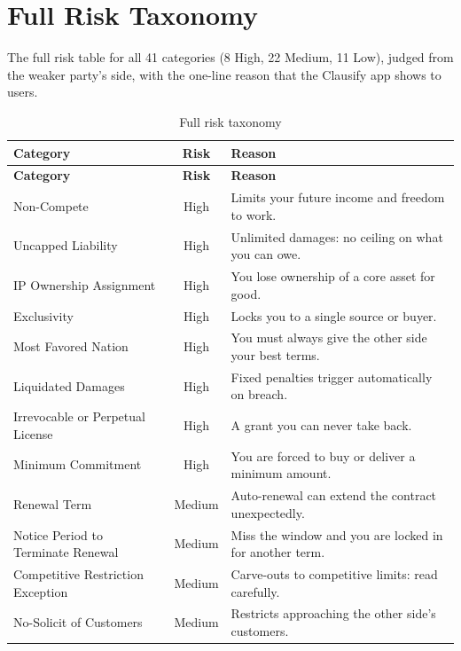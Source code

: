 \chapter{Full Risk Taxonomy}
\label{app:taxonomy}

The full risk table for all 41 categories (8 High, 22 Medium, 11 Low), judged from the weaker party's side, with the one-line reason that the Clausify app shows to users.

\begin{longtable}{>{\raggedright\arraybackslash}p{4.6cm} c >{\raggedright\arraybackslash}p{7.6cm}}
\caption{Full risk taxonomy}\\
\toprule
\textbf{Category} & \textbf{Risk} & \textbf{Reason}\\
\midrule
\endfirsthead
\toprule
\textbf{Category} & \textbf{Risk} & \textbf{Reason}\\
\midrule
\endhead
Non-Compete & \textcolor{riskhigh}{High} & Limits your future income and freedom to work.\\
Uncapped Liability & \textcolor{riskhigh}{High} & Unlimited damages: no ceiling on what you can owe.\\
IP Ownership Assignment & \textcolor{riskhigh}{High} & You lose ownership of a core asset for good.\\
Exclusivity & \textcolor{riskhigh}{High} & Locks you to a single source or buyer.\\
Most Favored Nation & \textcolor{riskhigh}{High} & You must always give the other side your best terms.\\
Liquidated Damages & \textcolor{riskhigh}{High} & Fixed penalties trigger automatically on breach.\\
Irrevocable or Perpetual License & \textcolor{riskhigh}{High} & A grant you can never take back.\\
Minimum Commitment & \textcolor{riskhigh}{High} & You are forced to buy or deliver a minimum amount.\\
\midrule
Renewal Term & \textcolor{riskmed}{Medium} & Auto-renewal can extend the contract unexpectedly.\\
Notice Period to Terminate Renewal & \textcolor{riskmed}{Medium} & Miss the window and you are locked in for another term.\\
Competitive Restriction Exception & \textcolor{riskmed}{Medium} & Carve-outs to competitive limits: read carefully.\\
No-Solicit of Customers & \textcolor{riskmed}{Medium} & Restricts approaching the other side's customers.\\

\end{longtable}
